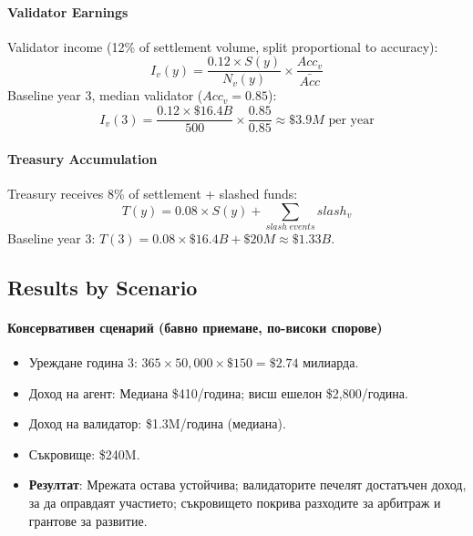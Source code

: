 \documentclass[11pt]{article}
\begin{document}
\paragraph{Validator Earnings} Validator income (12\% of settlement volume, split proportional to accuracy):
\begin{equation}
I_v(y) = \frac{0.12 \times S(y)}{N_v(y)} \times \frac{Acc_v}{\bar{Acc}}
\end{equation}
Baseline year 3, median validator ($Acc_v = 0.85$):
\begin{equation}
I_v(3) = \frac{0.12 \times \$16.4B}{500} \times \frac{0.85}{0.85} \approx \$3.9M \text{ per year}
\end{equation}

\paragraph{Treasury Accumulation} Treasury receives 8\% of settlement + slashed funds:
\begin{equation}
T(y) = 0.08 \times S(y) + \sum_{slash \; events} slash_v
\end{equation}
Baseline year 3: $T(3) = 0.08 \times \$16.4B + \$20M \approx \$1.33B$.

\subsection{Results by Scenario}
\paragraph{Консервативен сценарий (бавно приемане, по-високи спорове)}
\begin{itemize}[noitemsep]
  \item Уреждане година 3: $365 \times 50{,}000 \times \$150 = \$2.74$ милиарда.
  \item Доход на агент: Медиана \$410/година; висш ешелон \$2{,}800/година.
  \item Доход на валидатор: \$1.3M/година (медиана).
  \item Съкровище: \$240M.
  \item \textbf{Резултат}: Мрежата остава устойчива; валидаторите печелят достатъчен доход, за да оправдаят участието; съкровището покрива разходите за арбитраж и грантове за развитие.
\end{itemize}
\end{document}
